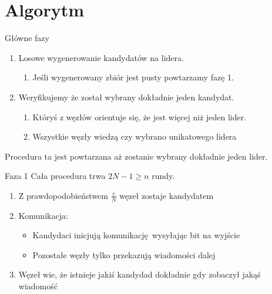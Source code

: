 \section{Algorytm}

\begin{frame}{Główne fazy}
  \begin{enumerate}[<+->]
    \item Losowe wygenerowanie kandydatów na lidera.
        \begin{enumerate}[<+->]
            \item Jeśli wygenerowany zbiór jest pusty powtarzamy fazę 1.
        \end{enumerate}
    \item Weryfikujemy że został wybrany dokładnie jeden kandydat.
        \begin{enumerate}[<+->]
            \item Któryś z węzłów orientuje się, że jest więcej niż jeden lider.
            \item Wszystkie węzły wiedzą czy wybrano unikatowego lidera
        \end{enumerate}
  \end{enumerate}
  \pause
  Procedura ta jest powtarzana aż zostanie wybrany dokładnie jeden lider.
\end{frame}

\begin{frame}{Faza 1}
    Cała procedura trwa $2N-1 \geq n$ rundy.
    \begin{enumerate}[<+->]
        \item Z prawdopodobieństwem $\frac{c}{N}$ węzeł zostaje kandydatem
        \item Komunikacja:
            \begin{itemize}
                \item Kandydaci inicjują komunikację wysyłając bit na wyjście
                \item Pozostałe węzły tylko przekazują wiadomości dalej
            \end{itemize}
        \item Węzeł wie, że istnieje jakiś kandydad dokładnie gdy zobaczył jakąś wiadomość
    \end{enumerate}
\end{frame}

